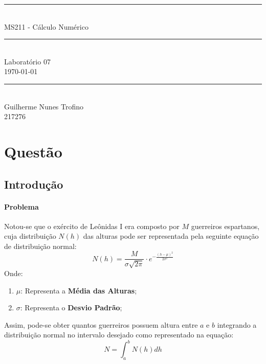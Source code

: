 \documentclass{article}
\begin{document}
    \begin{titlepage}
        \begin{center}
            \rule{450pt}{0.5pt}\\[4mm]
            {\Huge MS211 - Cálculo Numérico}\\
            \rule{450pt}{0.5pt}\\[2mm]
            {\Large Laboratório 07}\\[200mm]
            \today\\
            \rule{250pt}{0.5pt}\\
            {\large Guilherme Nunes Trofino}\\
            {\large 217276}\\
        \end{center}
    \end{titlepage}
\newpage

    \section{Questão}
        \subsection{Introdução}
            \paragraph{Problema}Notou-se que o exército de Leônidas I era composto por $M$ guerreiros espartanos, cuja distribuição $N(h)$ das alturas pode ser representada pela seguinte equação de distribuição normal:
                \begin{equation}
                    N(h) = \frac{M}{\sigma\sqrt{2\pi}} \cdot e^{-\frac{(h - \mu)^{2}}{2\sigma^2}}
                \end{equation}
            Onde:
                \begin{enumerate}[noitemsep]
                    \item $\mu$: Representa a \textbf{Média das Alturas};
                    \item $\sigma$: Representa o \textbf{Desvio Padrão};
                \end{enumerate}
            Assim, pode-se obter quantos guerreiros possuem altura entre $a$ e $b$ integrando a distribuição normal no intervalo desejado como representado na equação:
                \begin{equation}
                    N = \int_{a}^{b} N(h) dh
                \end{equation}
\end{document}
